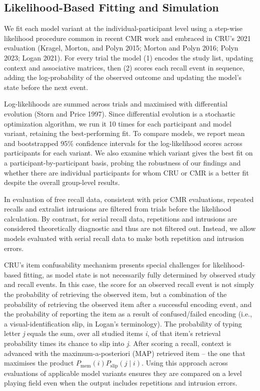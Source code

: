 \documentclass[
  letterpaper,
  11pt,
  english,
  singlespacing,
  headsepline]{MastersDoctoralThesis}
\begin{document}
\subsection{Likelihood-Based Fitting and
Simulation}\label{likelihood-based-fitting-and-simulation}

We fit each model variant at the individual-participant level using a
step-wise likelihood procedure common in recent CMR work and embraced in
CRU's 2021 evaluation (Kragel, Morton, and Polyn 2015; Morton and Polyn
2016; Polyn 2023; Logan 2021). For every trial the model (1) encodes the
study list, updating context and associative matrices, then (2) scores
each recall event in sequence, adding the log-probability of the
observed outcome and updating the model's state before the next event.

Log-likelihoods are summed across trials and maximised with differential
evolution (Storn and Price 1997). Since differential evolution is a
stochastic optimization algorithm, we run it 10 times for each
participant and model variant, retaining the best-performing fit. To
compare models, we report mean and bootstrapped 95\% confidence
intervals for the log-likelihood scores across participants for each
variant. We also examine which variant gives the best fit on a
participant-by-participant basis, probing the robustness of our findings
and whether there are individual participants for whom CRU or CMR is a
better fit despite the overall group-level results.

In evaluation of free recall data, consistent with prior CMR
evaluations, repeated recalls and extralist intrusions are filtered from
trials before the likelihood calculation. By contrast, for serial recall
data, repetitions and intrusions are considered theoretically diagnostic
and thus are not filtered out. Instead, we allow models evaluated with
serial recall data to make both repetition and intrusion errors.

CRU's item confusability mechanism presents special challenges for
likelihood-based fitting, as model state is not necessarily fully
determined by observed study and recall events. In this case, the score
for an observed recall event is not simply the probability of retrieving
the observed item, but a combination of the probability of retrieving
the observed item after a successful encoding event, and the probability
of reporting the item as a result of confused/failed encoding (i.e., a
visual-identification slip, in Logan's terminology). The probability of
typing letter \emph{j} equals the sum, over all studied items \emph{i},
of that item's retrieval probability times its chance to slip into
\emph{j}. After scoring a recall, context is advanced with the
maximum-a-posteriori (MAP) retrieved item -- the one that maximises the
product \(P_{\text{mem}}(i)P_{\text{slip}}(j\mid i)\). Using this
approach across evaluations of applicable model variants ensures they
are compared on a level playing field even when the output includes
repetitions and intrusion errors.
\end{document}
